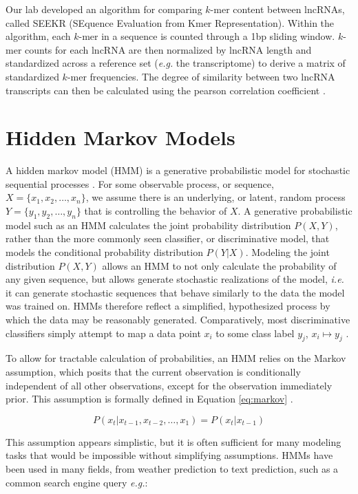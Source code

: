 Our lab developed an algorithm for comparing $k$-mer content between lncRNAs, called SEEKR (SEquence Evaluation from Kmer Representation). Within the algorithm, each $k$-mer in a sequence is counted through a 1bp sliding window. $k$-mer counts for each lncRNA are then normalized by lncRNA length and standardized across a reference set (\emph{e.g.} the transcriptome) to derive a matrix of standardized $k$-mer frequencies. The degree of similarity between two lncRNA transcripts can then be calculated using the pearson correlation coefficient \cite{Kirk2018FunctionalContent}.


\section{Hidden Markov Models}
A hidden markov model (HMM) is a generative probabilistic model for stochastic sequential processes \cite{Rabiner1989ARecognition,Burge1997PredictionDNA}. For some observable process, or sequence, $X = \{x_1,x_2,\dots, x_n\}$, we assume there is an underlying, or latent, random process $Y = \{y_1,y_2,\dots,y_n\}$ that is controlling the behavior of $X$. A generative probabilistic model such as an HMM calculates the joint probability distribution $P(X,Y)$, rather than the more commonly seen classifier, or discriminative model, that models the conditional probability distribution $P(Y|X)$. Modeling the joint distribution $P(X,Y)$ allows an HMM to not only calculate the probability of any given sequence, but allows generate stochastic realizations of the model, \emph{i.e.} it can generate stochastic sequences that behave similarly to the data the model was trained on. HMMs therefore reflect a simplified, hypothesized process by which the data may be reasonably generated. Comparatively, most discriminative classifiers simply attempt to map a data point $x_i$ to some class label $y_j$, $x_i\mapsto y_j$ \cite{Ng2002OnBayes}.

To allow for tractable calculation of probabilities, an HMM relies on the Markov assumption, which posits that the current observation is conditionally independent of all other observations, except for the observation immediately prior. This assumption is formally defined in Equation \ref{eq:markov} \cite{Rabiner1989ARecognition}.

\begin{equation}
    P(x_t|x_{t-1},x_{t-2},\dots,x_1) = P(x_t | x_{t-1})
\label{eq:markov}
\end{equation}

This assumption appears simplistic, but it is often sufficient for many modeling tasks that would be impossible without simplifying assumptions. HMMs have been used in many fields, from weather prediction to text prediction, such as a common search engine query \emph{e.g.}: 

